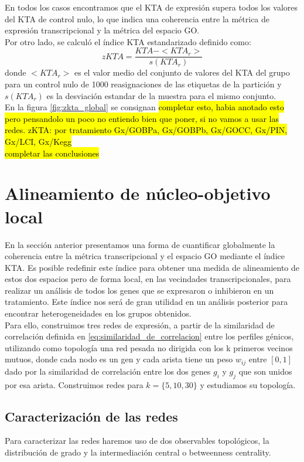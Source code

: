 En todos los casos encontramos que el KTA de expresión supera todos los valores del KTA de control nulo, lo que indica una coherencia entre la métrica de expresión transcripcional y la métrica del espacio GO.\\
Por otro lado, se calculó el índice KTA estandarizado definido como:
\begin{equation}
	zKTA = \frac{KTA-<KTA_r>}{s(KTA_r)}
\end{equation}
donde $<KTA_r>$ es el valor medio del conjunto de valores del KTA del grupo para un control nulo de 1000 reasignaciones de las etiquetas de la partición y $s(KTA_r)$ es la desviación estandar de la muestra para el mismo conjunto.\\
En la figura \ref{fig:zkta_global} se consignan \hl{completar esto, habia anotado esto pero pensandolo un poco no entiendo bien que poner, si no vamos a usar las redes. zKTA: por tratamiento Gx/GOBPa, Gx/GOBPb, Gx/GOCC, Gx/PIN, Gx/LCI, Gx/Kegg}\\
\hl{completar las conclusiones}
\section{Alineamiento de núcleo-objetivo local}
En la sección anterior presentamos una forma de cuantificar globalmente la coherencia entre la métrica transcripcional y el espacio GO mediante el índice KTA. Es posible redefinir este índice para obtener una medida de alineamiento de estos dos espacios pero de forma local, en las vecindades transcripcionales, para realizar un análisis de todos los genes que se expresaron o inhibieron en un tratamiento. Este índice nos será de gran utilidad en un análisis posterior para encontrar heterogeneidades en los grupos obtenidos.\\
Para ello, construimos tres redes de expresión, a partir de la similaridad de correlación definida en \ref{eq:similaridad_de_correlacion} entre los perfiles génicos, utilizando como topología una red pesada no dirigida con los k primeros vecinos mutuos, donde cada nodo es un gen y cada arista tiene un peso $w_{ij}$ entre $[0, 1]$ dado por la similaridad de correlación entre los dos genes $g_i$ y $g_j$ que son unidos por esa arista. Construimos redes para $k=\{5, 10, 30\}$ y estudiamos su topología.\\
\subsection{Caracterización de las redes}
Para caracterizar las redes haremos uso de dos observables topológicos, la distribución de grado y la intermediación central o betweenness centrality.\\
